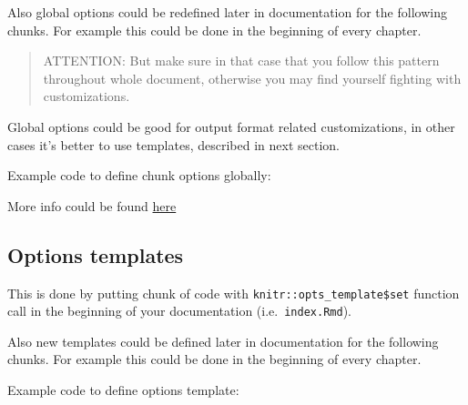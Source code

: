 \documentclass[
  12pt,
  a4paper,
  12pt,
  oneside,
  openany]{book}
\newenvironment{Shaded}{\begin{snugshade}}{\end{snugshade}}
\newcommand{\DataTypeTok}[1]{\textcolor[rgb]{0.27,0.27,0.27}{#1}}
\newcommand{\StringTok}[1]{\textcolor[rgb]{0.5,0.5,0.5}{#1}}
\begin{document}
Also global options could be redefined later in documentation for the following chunks. For example this could be done in the beginning of every chapter.

\begin{quote}
ATTENTION: But make sure in that case that you follow this pattern throughout whole document, otherwise you may find yourself fighting with customizations.\\
\end{quote}

Global options could be good for output format related customizations, in other cases it's better to use templates, described in next section.

Example code to define chunk options globally:

\begin{Shaded}
\end{Shaded}

More info could be found \href{https://bookdown.org/yihui/rmarkdown-cookbook/chunk-options.html\#chunk-options}{here}

\hypertarget{usage-customize-templateOpts}{%
\subsection{Options templates}\label{usage-customize-templateOpts}}

This is done by putting chunk of code with \texttt{knitr::opts\_template\$set} function call in the beginning of your documentation (i.e.~\texttt{index.Rmd}).

Also new templates could be defined later in documentation for the following chunks. For example this could be done in the beginning of every chapter.

Example code to define options template:
\end{document}
